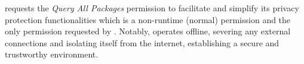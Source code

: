  \framework{} requests the \textit{Query All Packages} permission to facilitate and simplify its privacy protection functionalities which is a non-runtime (normal) permission and the only permission requested by \framework{}. Notably, \framework{} operates offline, severing any external connections and isolating itself from the internet, establishing a secure and trustworthy environment.
